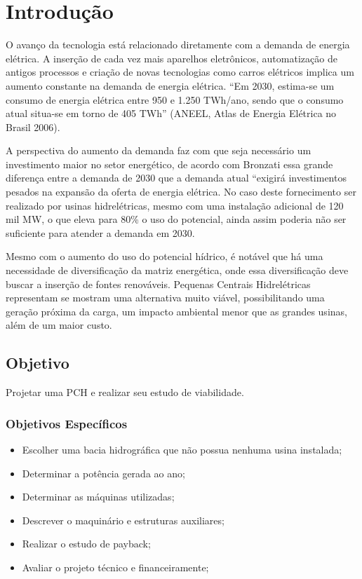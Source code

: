 
\chapter[Introdução]{Introdução}

O avanço da tecnologia está relacionado diretamente com a demanda de energia elétrica. A inserção de cada vez mais aparelhos eletrônicos, automatização de antigos processos e criação de novas tecnologias como carros elétricos implica um aumento constante na demanda de energia elétrica. “Em 2030, estima-se um consumo de energia elétrica entre 950 e 1.250 TWh/ano, sendo que o consumo atual situa-se em torno de 405 TWh” (ANEEL, Atlas de Energia Elétrica no Brasil 2006).

A perspectiva do aumento da demanda faz com que seja necessário um investimento maior no setor energético, de acordo com Bronzati essa grande diferença entre a demanda de 2030 que a demanda atual “exigirá investimentos pesados na expansão da oferta de energia elétrica. No caso deste fornecimento ser realizado por usinas hidrelétricas, mesmo com uma instalação adicional de 120 mil MW, o que eleva para 80\% o uso do potencial, ainda assim poderia não ser suficiente para atender a demanda em 2030.

Mesmo com o aumento do uso do potencial hídrico, é notável que há uma necessidade de diversificação da matriz energética, onde essa diversificação deve buscar a inserção de fontes renováveis. Pequenas Centrais Hidrelétricas representam se mostram uma alternativa muito viável, possibilitando uma geração próxima da carga, um impacto ambiental menor que as grandes usinas, além de um maior custo.

\section{Objetivo}\label{sec:obj}
Projetar uma PCH e realizar seu estudo de viabilidade.

\subsection{Objetivos Específicos}
\begin{itemize}
\item Escolher uma bacia hidrográfica que não possua nenhuma usina instalada;
\item Determinar a potência gerada ao ano;
\item Determinar as máquinas utilizadas;
\item Descrever o maquinário e estruturas auxiliares;
\item Realizar o estudo de payback;
\item Avaliar o projeto técnico e financeiramente;

\end{itemize}

